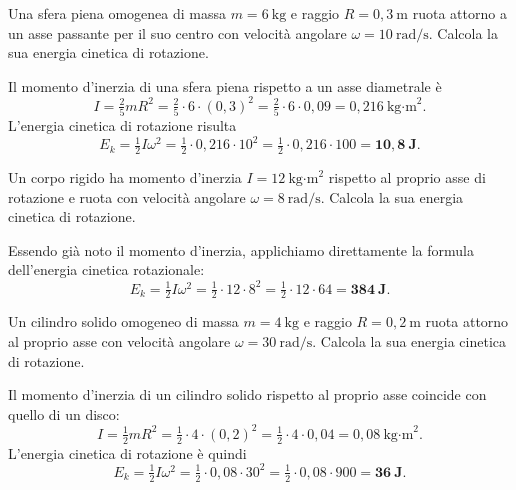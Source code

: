 \begin{question}[ID=4.3, subtitle={Energia cinetica di rotazione di una sfera}, tags={corpo rigido, energia cinetica rotazionale, sfera}, difficulty=facile]
Una sfera piena omogenea di massa $m = 6\ \text{kg}$ e raggio $R = 0{,}3\ \text{m}$ ruota attorno a un asse passante per il suo centro con velocità angolare $\omega = 10\ \text{rad/s}$. Calcola la sua energia cinetica di rotazione.
\begin{solution}
Il momento d'inerzia di una sfera piena rispetto a un asse diametrale è
\[
I = \tfrac{2}{5}mR^2 = \tfrac{2}{5}\cdot 6\cdot (0{,}3)^2 = \tfrac{2}{5}\cdot 6\cdot 0{,}09 = 0{,}216\ \text{kg·m}^2.
\]
L'energia cinetica di rotazione risulta
\[
E_k = \tfrac{1}{2}I\omega^2 = \tfrac{1}{2}\cdot 0{,}216\cdot 10^2 = \tfrac{1}{2}\cdot 0{,}216\cdot 100 = \mathbf{10{,}8\ \text{J}}.
\]
\end{solution}
\end{question}


\begin{question}[ID=4.4, subtitle={Energia cinetica rotazionale dato il momento d'inerzia}, tags={corpo rigido, energia cinetica rotazionale}, difficulty=facile]
Un corpo rigido ha momento d'inerzia $I = 12\ \text{kg·m}^2$ rispetto al proprio asse di rotazione e ruota con velocità angolare $\omega = 8\ \text{rad/s}$. Calcola la sua energia cinetica di rotazione.
\begin{solution}
Essendo già noto il momento d'inerzia, applichiamo direttamente la formula dell'energia cinetica rotazionale:
\[
E_k = \tfrac{1}{2}I\omega^2 = \tfrac{1}{2}\cdot 12\cdot 8^2 = \tfrac{1}{2}\cdot 12\cdot 64 = \mathbf{384\ \text{J}}.
\]
\end{solution}
\end{question}


\begin{question}[ID=4.5, subtitle={Energia cinetica di rotazione di un cilindro solido}, tags={corpo rigido, energia cinetica rotazionale, cilindro}, difficulty=facile]
Un cilindro solido omogeneo di massa $m = 4\ \text{kg}$ e raggio $R = 0{,}2\ \text{m}$ ruota attorno al proprio asse con velocità angolare $\omega = 30\ \text{rad/s}$. Calcola la sua energia cinetica di rotazione.
\begin{solution}
Il momento d'inerzia di un cilindro solido rispetto al proprio asse coincide con quello di un disco:
\[
I = \tfrac{1}{2}mR^2 = \tfrac{1}{2}\cdot 4\cdot (0{,}2)^2 = \tfrac{1}{2}\cdot 4\cdot 0{,}04 = 0{,}08\ \text{kg·m}^2.
\]
L'energia cinetica di rotazione è quindi
\[
E_k = \tfrac{1}{2}I\omega^2 = \tfrac{1}{2}\cdot 0{,}08\cdot 30^2 = \tfrac{1}{2}\cdot 0{,}08\cdot 900 = \mathbf{36\ \text{J}}.
\]
\end{solution}
\end{question}

